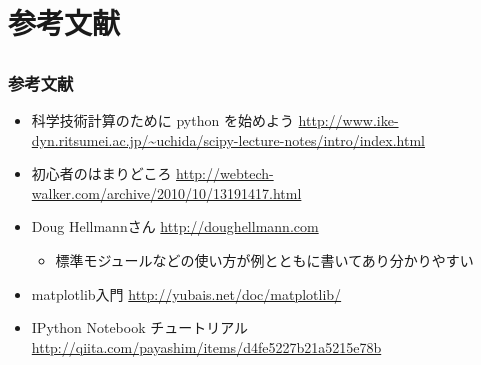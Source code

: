 \section{参考文献}

\subsection*{\redm\whiteb\greenb}
\begin{frame}[t]
\frametitle{参考文献}
\begin{itemize}
\item 科学技術計算のために python を始めよう
  \url{http://www.ike-dyn.ritsumei.ac.jp/~uchida/scipy-lecture-notes/intro/index.html}
\item 初心者のはまりどころ \url{http://webtech-walker.com/archive/2010/10/13191417.html}
\item Doug Hellmannさん \url{http://doughellmann.com}
  \begin{itemize}
  \item 標準モジュールなどの使い方が例とともに書いてあり分かりやすい
  \end{itemize}
\item matplotlib入門 \url{http://yubais.net/doc/matplotlib/}
\item IPython Notebook チュートリアル \url{http://qiita.com/payashim/items/d4fe5227b21a5215e78b}
\end{itemize}
\end{frame}


